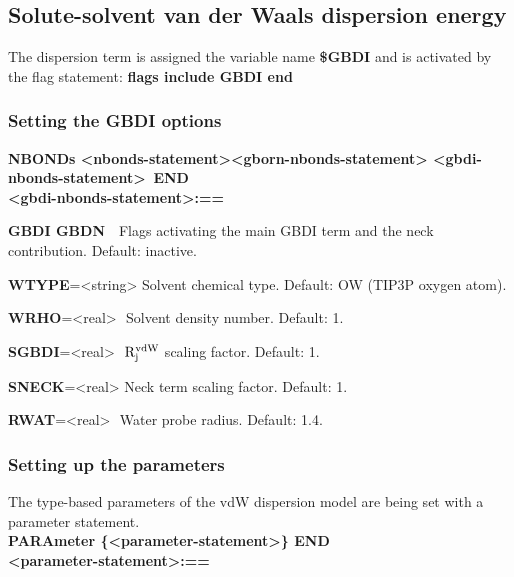 \documentclass[12pt]{report}
\begin{document}
\subsection{Solute-solvent van der Waals dispersion energy}
The dispersion term is assigned the variable name \textbf{\$GBDI} and is activated by the flag statement:
\textbf{flags include GBDI end}

\subsubsection{Setting the GBDI options}
\noindent\textbf{NBONDs \textless nbonds-statement\textgreater  \textbar \textless gborn-nbonds-statement\textgreater 
\textbar \textless gbdi-nbonds-statement\textgreater \, END}\\
\textbf{\textless gbdi-nbonds-statement\textgreater :==} 

\textbf{GBDI GBDN} \,\, Flags activating the main GBDI term and the neck contribution. Default: inactive.

\textbf{WTYPE}=\textless string\textgreater \,\,Solvent chemical type.  Default: OW (TIP3P oxygen atom).

\textbf{WRHO}=\textless real\textgreater \,\, Solvent density number. Default: 1.

\textbf{SGBDI}=\textless real\textgreater \,\, $\rm R_j^{vdW}$ scaling factor. Default: 1.

\textbf{SNECK}=\textless real\textgreater \,\,Neck term scaling factor. Default: 1.

\textbf{RWAT}=\textless real\textgreater \,\, Water probe radius. Default: 1.4.

\subsubsection{Setting up the parameters}

The type-based  parameters of the vdW dispersion model are being set with a parameter statement. \\ 

\noindent\textbf{PARAmeter \{\textless parameter-statement\textgreater\} END}\\   
\textbf{\textless parameter-statement\textgreater :==}\\
\end{document}
